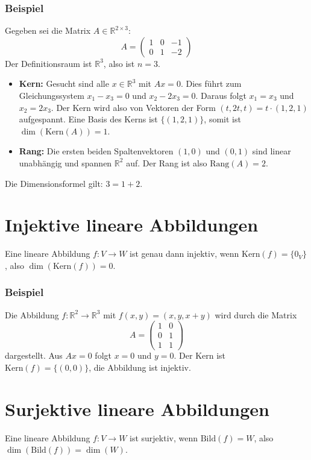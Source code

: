 \subsubsection{Beispiel}
Gegeben sei die Matrix \(A \in \mathbb{R}^{2 \times 3}\):
\[
    A = \begin{pmatrix} 1 & 0 & -1 \\ 0 & 1 & -2 \end{pmatrix}
\]
Der Definitionsraum ist \(\mathbb{R}^3\), also ist \(n=3\).
\begin{itemize}
    \item \textbf{Kern:} Gesucht sind alle \(x \in \mathbb{R}^3\) mit \(Ax=0\). Dies führt zum Gleichungssystem \(x_1 - x_3 = 0\) und \(x_2 - 2x_3 = 0\). Daraus folgt \(x_1 = x_3\) und \(x_2 = 2x_3\). Der Kern wird also von Vektoren der Form \((t, 2t, t) = t \cdot (1, 2, 1)\) aufgespannt. Eine Basis des Kerns ist \(\{(1, 2, 1)\}\), somit ist \(\dim(\mathrm{Kern}(A)) = 1\).
    \item \textbf{Rang:} Die ersten beiden Spaltenvektoren \((1,0)\) und \((0,1)\) sind linear unabhängig und spannen \(\mathbb{R}^2\) auf. Der Rang ist also \(\mathrm{Rang}(A) = 2\).
\end{itemize}
Die Dimensionsformel gilt: \(3 = 1 + 2\).

\section{Injektive lineare Abbildungen}
Eine lineare Abbildung \(f: V \to W\) ist genau dann injektiv, wenn
\(\mathrm{Kern}(f) = \{0_V\}\), also \(\dim(\mathrm{Kern}(f)) = 0\).

\subsubsection{Beispiel}
Die Abbildung \(f: \mathbb{R}^2 \to \mathbb{R}^3\) mit \(f(x,y) = (x, y, x+y)\)
wird durch die Matrix
\[
    A = \begin{pmatrix} 1 & 0 \\ 0 & 1 \\ 1 & 1 \end{pmatrix}
\]
dargestellt. Aus \(Ax=0\) folgt \(x=0\) und \(y=0\). Der Kern ist
\(\mathrm{Kern}(f) = \{(0,0)\}\), die Abbildung ist injektiv.

\section{Surjektive lineare Abbildungen}
Eine lineare Abbildung \(f: V \to W\) ist surjektiv, wenn \(\mathrm{Bild}(f) =
W\), also \(\dim(\mathrm{Bild}(f)) = \dim(W)\).

